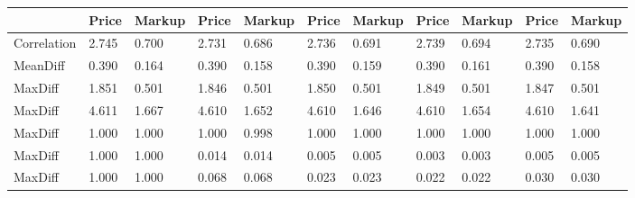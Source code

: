 \begin{table}[htbp]
\begin{tabular}{|l|l|l|l|l|l|l|l|l|l|l|}\hline  
 & Price  & Markup  & Price  & Markup  & Price  & Markup  & Price  & Markup  & Price  & Markup  \\ \hline  
Correlation &     2.745 &     0.700 &     2.731 &     0.686 &     2.736 &     0.691 &     2.739 &     0.694 &     2.735 &     0.690 \\ \hline 
MeanDiff &     0.390 &     0.164 &     0.390 &     0.158 &     0.390 &     0.159 &     0.390 &     0.161 &     0.390 &     0.158 \\ \hline 
MaxDiff &     1.851 &     0.501 &     1.846 &     0.501 &     1.850 &     0.501 &     1.849 &     0.501 &     1.847 &     0.501 \\ \hline 
MaxDiff &     4.611 &     1.667 &     4.610 &     1.652 &     4.610 &     1.646 &     4.610 &     1.654 &     4.610 &     1.641 \\ \hline 
MaxDiff &     1.000 &     1.000 &     1.000 &     0.998 &     1.000 &     1.000 &     1.000 &     1.000 &     1.000 &     1.000 \\ \hline 
MaxDiff &     1.000 &     1.000 &     0.014 &     0.014 &     0.005 &     0.005 &     0.003 &     0.003 &     0.005 &     0.005 \\ \hline 
MaxDiff &     1.000 &     1.000 &     0.068 &     0.068 &     0.023 &     0.023 &     0.022 &     0.022 &     0.030 &     0.030 \\ \hline 
  \end{tabular}
\end{table}
